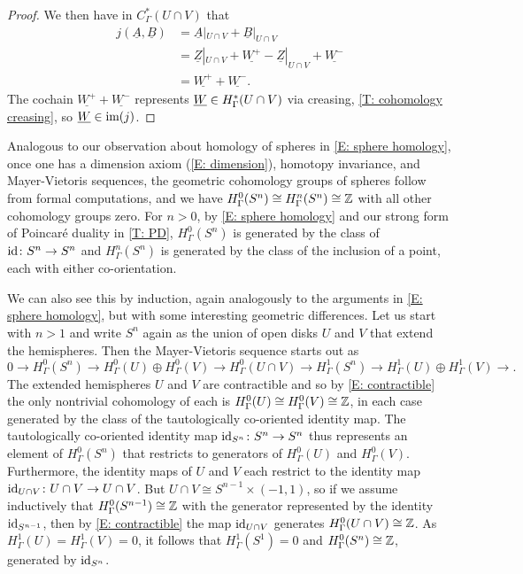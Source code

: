 \begin{proof}
	We then have in $C^*_\Gamma(U \cap V)$ that
	\begin{align*}
		j(\underline{A}, \underline{B})& = \underline{A}|_{U \cap V} + \underline{B}|_{U \cap V}\\
		& = \underline{Z}|_{U \cap V}+ \underline{W^+} - \underline{Z}|_{U \cap V} + \underline{W^-}\\
		& = \underline{W^+} + \underline{W^-}.
	\end{align*}
	The cochain $\underline{W^+} + \underline{W^-}$ represents $\underline{W} \in H^*_\Gamma(U \cap V)$ via creasing, \cref{T: cohomology creasing}, so $\underline{W} \in \text{im}(j)$.
\end{proof}

\begin{example}\label{E: cohomology of spheres}
Analogous to our observation about homology of spheres in \cref{E: sphere homology}, once one has a dimension axiom (\cref{E: dimension}), homotopy invariance, and Mayer-Vietoris sequences, the geometric cohomology groups of spheres follow from formal computations, and we have $H^0_{\Gamma}(S^n)\cong H^n_\Gamma(S^n)\cong \mathbb{Z}$ with all other cohomology groups zero.
For $n>0$, by \cref{E: sphere homology} and our strong form of Poincar\'e duality in \cref{T: PD}, $H^0_{\Gamma}(S^n)$ is generated by the class of $\mathrm{id} \colon S^n \to S^n$ and $H^n_{\Gamma}(S^n)$ is generated by the class of the inclusion of a point, each with either co-orientation.

We can also see this by induction, again analogously to the arguments in \cref{E: sphere homology}, but with some interesting geometric differences. Let us start with $n>1$ and write $S^n$ again as the union of open disks $U$ and $V$ that extend the hemispheres. Then the Mayer-Vietoris sequence starts out as
\begin{equation*}
0\to H^0_\Gamma(S^n) \to H^0_\Gamma(U) \oplus H^0_\Gamma(V) \to H^0_\Gamma(U\cap V) \to H^1_\Gamma(S^n) \to H^1_\Gamma(U) \oplus H^1_\Gamma(V) \to.
\end{equation*}
The extended hemispheres $U$ and $V$ are contractible and so by \cref{E: contractible} the only nontrivial cohomology of each is $H^0_\Gamma(U) \cong H^0_\Gamma(V) \cong \mathbb{Z}$, in each case generated by the class of the tautologically co-oriented identity map.
The tautologically co-oriented identity map $\mathrm{id}_{S^n} \colon S^n \to S^n$ thus represents an element of $H^0_\Gamma(S^n)$ that restricts to generators of $H^0_\Gamma(U)$ and $H^0_\Gamma(V)$.
Furthermore, the identity maps of $U$ and $V$ each restrict to the identity map $\mathrm{id}_{U \cap V} \colon U \cap V \to U \cap V$.
But $U \cap V \cong S^{n-1} \times (-1,1)$, so if we assume inductively that $H^0_\Gamma(S^{n-1}) \cong \mathbb{Z}$ with the generator represented by the identity $\mathrm{id}_{S^{n-1}}$, then by \cref{E: contractible} the map $\mathrm{id}_{U \cap V}$ generates $H^0_\Gamma(U \cap V) \cong \mathbb{Z}$.
As $H^1_\Gamma(U) = H^1_\Gamma(V) = 0$, it follows that $H^1_\Gamma(S^1) = 0$ and $H^0_\Gamma(S^n) \cong \mathbb{Z}$, generated by $\mathrm{id}_{S^n}$.


\end{example}
